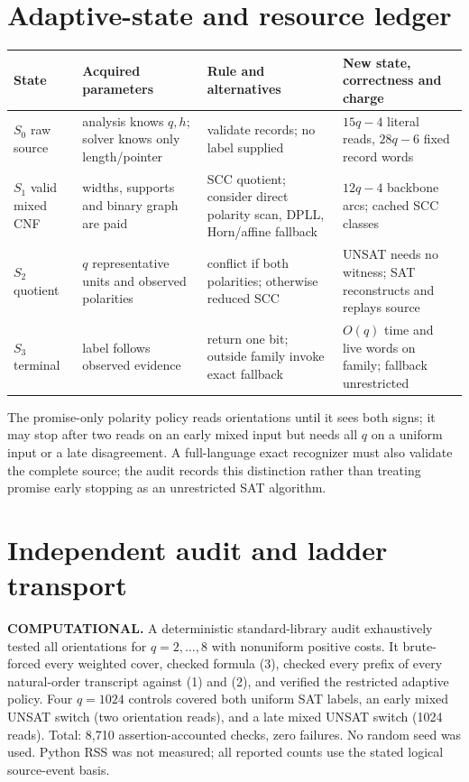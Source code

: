 \documentclass[11pt]{article}
\begin{document}
\section{Adaptive-state and resource ledger}
\begin{center}\small
\begin{tabular}{p{.15\linewidth}p{.23\linewidth}p{.25\linewidth}p{.27\linewidth}}
\toprule
State & Acquired parameters & Rule and alternatives & New state, correctness and charge\\\midrule
$S_0$ raw source & analysis knows $q,h$; solver knows only length/pointer & validate records; no label supplied & $15q-4$ literal reads, $28q-6$ fixed record words\\
$S_1$ valid mixed CNF & widths, supports and binary graph are paid & SCC quotient; consider direct polarity scan, DPLL, Horn/affine fallback & $12q-4$ backbone arcs; cached SCC classes\\
$S_2$ quotient & $q$ representative units and observed polarities & conflict if both polarities; otherwise reduced SCC & UNSAT needs no witness; SAT reconstructs and replays source\\
$S_3$ terminal & label follows observed evidence & return one bit; outside family invoke exact fallback & $O(q)$ time and live words on family; fallback unrestricted\\
\bottomrule
\end{tabular}
\end{center}
The promise-only polarity policy reads orientations until it sees both signs;
it may stop after two reads on an early mixed input but needs all $q$ on a
uniform input or a late disagreement.  A full-language exact recognizer must
also validate the complete source; the audit records this distinction rather
than treating promise early stopping as an unrestricted SAT algorithm.

\section{Independent audit and ladder transport}
\textbf{COMPUTATIONAL.} A deterministic standard-library audit exhaustively
tested all orientations for $q=2,\ldots,8$ with nonuniform positive costs.  It
brute-forced every weighted cover, checked formula (3), checked every prefix
of every natural-order transcript against (1) and (2), and verified the
restricted adaptive policy.  Four $q=1024$ controls covered both uniform SAT
labels, an early mixed UNSAT switch (two orientation reads), and a late mixed
UNSAT switch (1024 reads).  Total: 8,710 assertion-accounted checks, zero
failures.  No random seed was used.  Python RSS was not measured; all reported
counts use the stated logical source-event basis.
\end{document}
